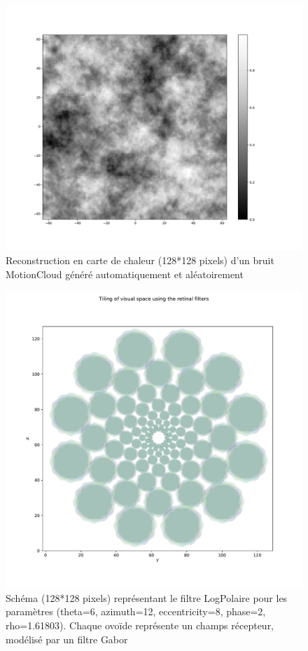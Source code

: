\begin{figure}[th]
\centering
\includegraphics[scale=0.4]{Figures/motioncloud_noise}
\decoRule
\caption[Figure]{Reconstruction en carte de chaleur (128*128 pixels) d'un bruit MotionCloud généré automatiquement et aléatoirement \autocite{Leon2012}}
\label{fig:motioncloud_noise}
\end{figure}

\begin{figure}[th]
\centering
\includegraphics[scale=0.4]{Figures/retina_filter}
\decoRule
\caption[Figure]{Schéma (128*128 pixels) représentant le filtre LogPolaire pour les paramètres (theta=6, azimuth=12, eccentricity=8, phase=2, rho=1.61803). Chaque ovoïde représente un champs récepteur, modélisé par un filtre Gabor \autocite{Freeman2011}}
\label{fig:logpol_filter}
\end{figure}

